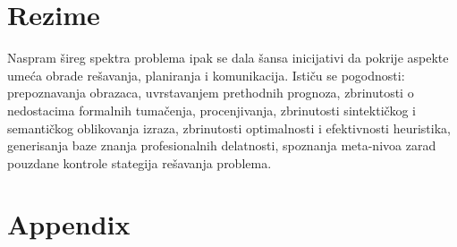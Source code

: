 \documentclass[fontsize=11bp, paper=a4]{scrartcl}
\begin{document}
\section{\normalsize{Rezime}}
Naspram šireg spektra problema ipak se dala šansa inicijativi da pokrije aspekte umeća obrade rešavanja, planiranja i komunikacija. Ističu se pogodnosti: prepoznavanja obrazaca, uvrstavanjem prethodnih prognoza, zbrinutosti o nedostacima formalnih tumačenja, procenjivanja, zbrinutosti sintektičkog i semantičkog oblikovanja izraza, zbrinutosti optimalnosti i efektivnosti heuristika, generisanja baze znanja profesionalnih delatnosti, spoznanja meta-nivoa zarad pouzdane kontrole stategija rešavanja problema.

\newpage
\appendix %
\section*{Appendix} 
\end{document}
